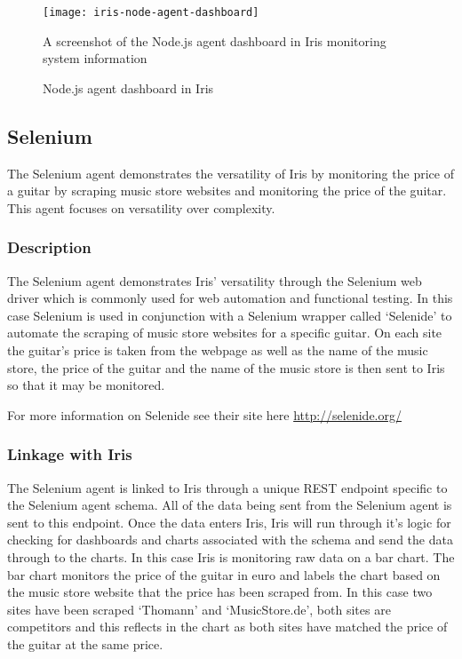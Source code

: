 \documentclass[12pt,a4paper,titlepage]{report}
\begin{document}
\begin{figure}[H]
\begin{tcolorbox}
\begin{center}
\texttt{[image: iris-node-agent-dashboard]}
\end{center}
A screenshot of the Node.js agent dashboard in Iris monitoring system information
\end{tcolorbox}
\caption{Node.js agent dashboard in Iris}
\end{figure}


\subsection{Selenium}
The Selenium agent demonstrates the versatility of Iris by monitoring the price of a guitar by scraping music store websites and monitoring the price of the guitar. This agent focuses on versatility over complexity.
\subsubsection{Description}
The Selenium agent demonstrates Iris' versatility through the Selenium web driver which is commonly used for web automation and functional testing. In this case Selenium is used in conjunction with a Selenium wrapper called `Selenide' to automate the scraping of music store websites for a specific guitar. On each site the guitar's price is taken from the webpage as well as the name of the music store, the price of the guitar and the name of the music store is then sent to Iris so that it may be monitored.

For more information on Selenide see their site here \url{http://selenide.org/}

\subsubsection{Linkage with Iris}
The Selenium agent is linked to Iris through a unique REST endpoint specific to the Selenium agent schema. All of the data being sent from the Selenium agent is sent to this endpoint. Once the data enters Iris, Iris will run through it's logic for checking for dashboards and charts associated with the schema and send the data through to the charts. 
In this case Iris is monitoring raw data on a bar chart. The bar chart monitors the price of the guitar in euro and labels the chart based on the music store website that the price has been scraped from. In this case two sites have been scraped `Thomann' and `MusicStore.de', both sites are competitors and this reflects in the chart as both sites have matched the price of the guitar at the same price.
\end{document}
